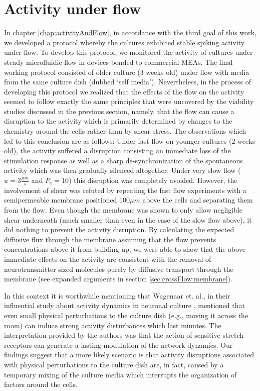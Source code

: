 \section{Activity under flow}
In chapter \ref{chap:activityAndFlow}, in accordance with the third goal of this work, we developed a protocol whereby the cultures exhibited stable spiking activity under flow. To develop this protocol, we monitored the activity of cultures under steady microfluidic flow in devices bonded to commercial MEAs. The final working protocol consisted of older culture (3 weeks old) under flow with media from the same culture dish (dubbed `self media'). Nevertheless, in the process of developing this protocol we realized that the effects of the flow on the activity seemed to follow exactly the same principles that were uncovered by the viability studies discussed in the previous section, namely, that the flow can cause a disruption to the activity which is primarily determined by changes to the chemistry around the cells rather than by shear stress. The observations which led to this conclusion are as follows: Under fast flow on younger cultures (2 weeks old), the activity suffered a disruption consisting an immediate loss of the stimulation response as well as a sharp de-synchronization of the spontaneous activity which was then gradually silenced altogether. Under very slow flow (\(u=3\frac{\mu m}{s}\) and \(P_{e}=10\)) this disruption was completely avoided. However, the involvement of shear was refuted by repeating the fast flow experiments with a semipermeable membrane positioned \(100\mu m\) above the cells and separating them from the flow. Even though the membrane was shown to only allow negligible shear underneath (much smaller than even in the case of the slow flow above), it did nothing to prevent the activity disruption. By calculating the expected diffusive flux through the membrane assuming that the flow prevents concentrations above it from building up, we were able to show that the above immediate effects on the activity are consistent with the removal of neurotransmitter sized molecules purely by diffusive transport through the membrane (see expanded arguments in section \ref{sec:crossFlow:membrane}).

In this context it is worthwhile mentioning that Wagenaar et. al., in their influential study about activity dynamics in neuronal culture \cite{wagenaar2006extremely}, mentioned that even small physical perturbations to the culture dish (e.g., moving it across the room) can induce strong activity disturbances which last minutes. The interpretation provided by the authors was that the action of sensitive stretch receptors can generate a lasting modulation of the network dynamics. Our findings suggest that a more likely scenario is that activity disruptions associated with physical perturbations to the culture dish are, in fact, caused by a temporary mixing of the culture media which interrupts the organization of factors around the cells.


